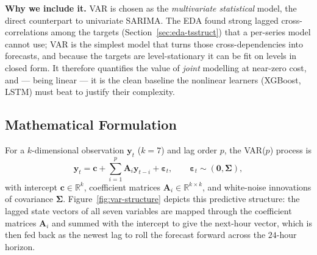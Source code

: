 \documentclass[12pt,a4paper,oneside]{report}
\begin{document}
\textbf{Why we include it.} VAR is chosen as the \emph{multivariate statistical}
model, the direct counterpart to univariate SARIMA. The EDA found strong lagged
cross-correlations among the targets (Section~\ref{sec:eda-tsstruct}) that a
per-series model cannot use; VAR is the simplest model that turns those
cross-dependencies into forecasts, and because the targets are level-stationary it
can be fit on levels in closed form. It therefore quantifies the value of
\emph{joint} modelling at near-zero cost, and --- being linear --- it is the clean
baseline the nonlinear learners (XGBoost, LSTM) must beat to justify their
complexity.

\subsection{Mathematical Formulation}
\label{sec:var-theory}
For a $k$-dimensional observation $\mathbf{y}_t$ ($k=7$) and lag order $p$, the
VAR($p$) process is
\begin{equation}
  \mathbf{y}_t = \mathbf{c} + \sum_{i=1}^{p} \mathbf{A}_i \mathbf{y}_{t-i}
  + \bm{\varepsilon}_t,
  \qquad \bm{\varepsilon}_t \sim (\mathbf{0}, \bm{\Sigma}),
  \label{eq:var}
\end{equation}
with intercept $\mathbf{c}\in\mathbb{R}^k$, coefficient matrices
$\mathbf{A}_i\in\mathbb{R}^{k\times k}$, and white-noise innovations of covariance
$\bm{\Sigma}$. Figure~\ref{fig:var-structure} depicts this predictive structure: the
lagged state vectors of all seven variables are mapped through the coefficient
matrices $\mathbf{A}_i$ and summed with the intercept to give the next-hour vector,
which is then fed back as the newest lag to roll the forecast forward across the
$24$-hour horizon.
\end{document}
